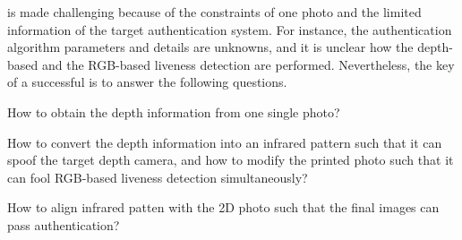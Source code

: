 \alias is made challenging because of the constraints of one photo and the limited information of the target authentication system. For instance, the authentication algorithm parameters and details are unknowns, and it is unclear how the depth-based and the RGB-based liveness detection are performed. Nevertheless, the key of a successful \alias is to answer the following questions. 
\begin{inparaenum}
\item How to obtain the depth information from one single photo?
\item How to convert the depth information into an infrared pattern such that it can spoof the target depth camera, and how to modify the printed photo such that it can fool RGB-based liveness detection simultaneously?
\item How to align infrared patten with the 2D photo such that the final images can pass authentication? 
\end{inparaenum}

